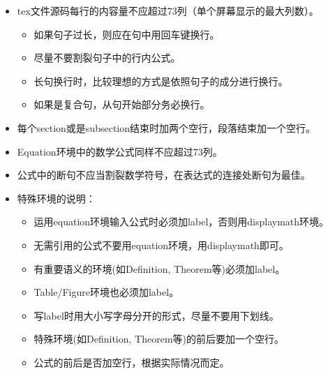 \begin{itemize}
    \item tex文件源码每行的内容量不应超过73列（单个屏幕显示的最大列数）。
    \begin{itemize}
        \item 如果句子过长，则应在句中用回车键换行。
        \item 尽量不要割裂句子中的行内公式。
        \item 长句换行时，比较理想的方式是依照句子的成分进行换行。
        \item 如果是复合句，从句开始部分务必换行。
    \end{itemize}
    \item 每个section或是subsection结束时加两个空行，段落结束加一个空行。
    \item Equation环境中的数学公式同样不应超过73列。
    \item 公式中的断句不应当割裂数学符号，在表达式的连接处断句为最佳。
    \item 特殊环境的说明：
    \begin{itemize}
        \item 运用equation环境输入公式时必须加label，否则用displaymath环境。
        \item 无需引用的公式不要用equation环境，用displaymath即可。
        \item 有重要语义的环境(如Definition, Theorem等)必须加label。
        \item Table/Figure环境也必须加label。
        \item 写label时用大小写字母分开的形式，尽量不要用下划线。
        \item 特殊环境(如Definition, Theorem等)的前后要加一个空行。
        \item 公式的前后是否加空行，根据实际情况而定。
    \end{itemize}
\end{itemize}